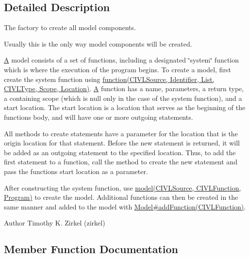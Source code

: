 \subsection{Detailed Description}
The factory to create all model components. 

Usually this is the only way model components will be created. 

\hyperlink{structA}{A} model consists of a set of functions, including a designated \char`\"{}system\char`\"{} function which is where the execution of the program begins. To create a model, first create the system function using \hyperlink{}{function(\+C\+I\+V\+L\+Source, Identifier, List, C\+I\+V\+L\+Type, Scope, Location)}. \hyperlink{structA}{A} function has a name, parameters, a return type, a containing scope (which is null only in the case of the system function), and a start location. The start location is a location that serves as the beginning of the function\textquotesingle{}s body, and will have one or more outgoing statements. 

All methods to create statements have a parameter for the location that is the origin location for that statement. Before the new statement is returned, it will be added as an outgoing statement to the specified location. Thus, to add the first statement to a function, call the method to create the new statement and pass the function\textquotesingle{}s start location as a parameter. 

After constructing the system function, use \hyperlink{interfaceedu_1_1udel_1_1cis_1_1vsl_1_1civl_1_1model_1_1IF_1_1ModelFactory_aae16306b2abda7544881f2593aae8840}{model(\+C\+I\+V\+L\+Source, C\+I\+V\+L\+Function, Program)} to create the model. Additional functions can then be created in the same manner and added to the model with \hyperlink{interfaceedu_1_1udel_1_1cis_1_1vsl_1_1civl_1_1model_1_1IF_1_1Model_ace038d85a33ce2a63f2b0e0102bec932}{Model\#add\+Function(\+C\+I\+V\+L\+Function)}.

\begin{DoxyAuthor}{Author}
Timothy K. Zirkel (zirkel) 
\end{DoxyAuthor}


\subsection{Member Function Documentation}
\hypertarget{interfaceedu_1_1udel_1_1cis_1_1vsl_1_1civl_1_1model_1_1IF_1_1ModelFactory_a59c144256ee26ef496fdbcfc8004ab1c}{}
